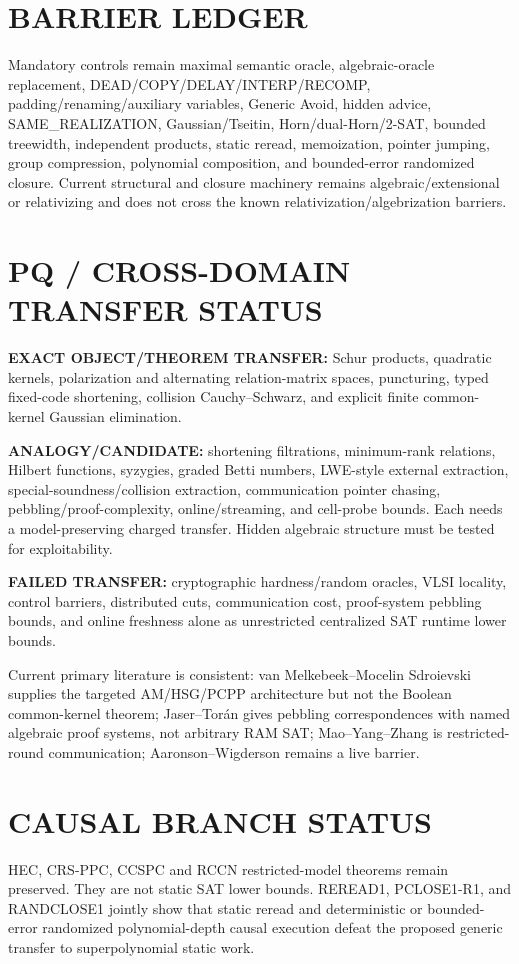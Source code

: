 \documentclass[11pt]{article}
\begin{document}
\section*{BARRIER LEDGER}
Mandatory controls remain maximal semantic oracle, algebraic-oracle replacement, DEAD/COPY/DELAY/INTERP/RECOMP, padding/renaming/auxiliary variables, Generic Avoid, hidden advice, SAME_REALIZATION, Gaussian/Tseitin, Horn/dual-Horn/2-SAT, bounded treewidth, independent products, static reread, memoization, pointer jumping, group compression, polynomial composition, and bounded-error randomized closure. Current structural and closure machinery remains algebraic/extensional or relativizing and does not cross the known relativization/algebrization barriers.

\section*{PQ / CROSS-DOMAIN TRANSFER STATUS}
\textbf{EXACT OBJECT/THEOREM TRANSFER:} Schur products, quadratic kernels, polarization and alternating relation-matrix spaces, puncturing, typed fixed-code shortening, collision Cauchy--Schwarz, and explicit finite common-kernel Gaussian elimination.

\textbf{ANALOGY/CANDIDATE:} shortening filtrations, minimum-rank relations, Hilbert functions, syzygies, graded Betti numbers, LWE-style external extraction, special-soundness/collision extraction, communication pointer chasing, pebbling/proof-complexity, online/streaming, and cell-probe bounds. Each needs a model-preserving charged transfer. Hidden algebraic structure must be tested for exploitability.

\textbf{FAILED TRANSFER:} cryptographic hardness/random oracles, VLSI locality, control barriers, distributed cuts, communication cost, proof-system pebbling bounds, and online freshness alone as unrestricted centralized SAT runtime lower bounds.

Current primary literature is consistent: van Melkebeek--Mocelin Sdroievski supplies the targeted AM/HSG/PCPP architecture but not the Boolean common-kernel theorem; Jaser--Torán gives pebbling correspondences with named algebraic proof systems, not arbitrary RAM SAT; Mao--Yang--Zhang is restricted-round communication; Aaronson--Wigderson remains a live barrier.

\section*{CAUSAL BRANCH STATUS}
HEC, CRS-PPC, CCSPC and RCCN restricted-model theorems remain preserved. They are not static SAT lower bounds. REREAD1, PCLOSE1-R1, and RANDCLOSE1 jointly show that static reread and deterministic or bounded-error randomized polynomial-depth causal execution defeat the proposed generic transfer to superpolynomial static work.
\end{document}
